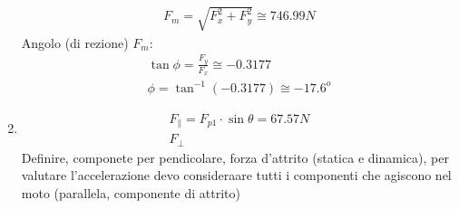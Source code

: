 \documentclass{report}
\begin{document}
\begin{enumerate}
\begin{eqnarray*}
  F_m=\sqrt{F_x^2+F_y^2} \cong 746.99N
\end{eqnarray*}
Angolo (di rezione) $F_m$:
\begin{eqnarray*}
  \tan \phi = \frac{F_y}{F_x}\cong  - 0.3177 \\
  \phi = \tan^{-1}\left(- 0.3177\right) \cong - 17.6^o
\end{eqnarray*}
\item
  \begin{eqnarray*}
    F_{\parallel}=F_{p1}\cdot \sin \theta = 67.57N\\
    F_{\perp}
  \end{eqnarray*}
  Definire, componete per pendicolare, forza d'attrito (statica e dinamica), per valutare l'accelerazione devo consideraare tutti i componenti che agiscono nel moto (parallela, componente di attrito)
\end{enumerate}
\end{document}
